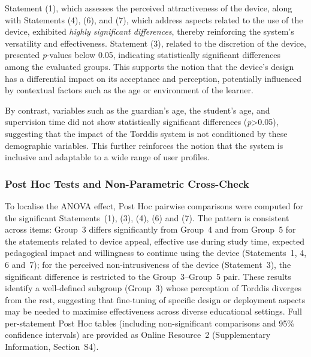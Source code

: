 Statement (1), which assesses the perceived attractiveness of the device, along with Statements (4), (6), and (7), which address aspects related to the use of the device, exhibited \textit{highly significant differences}, thereby reinforcing the system’s versatility and effectiveness. Statement (3), related to the discretion of the device, presented \textit{p}-values below 0.05, indicating statistically significant differences among the evaluated groups. This supports the notion that the device’s design has a differential impact on its acceptance and perception, potentially influenced by contextual factors such as the age or environment of the learner.

By contrast, variables such as the guardian’s age, the student’s age, and supervision time did not show statistically significant differences (\textit{p}>0.05), suggesting that the impact of the Torddis system is not conditioned by these demographic variables. This further reinforces the notion that the system is inclusive and adaptable to a wide range of user profiles.

\subsubsection{Post Hoc Tests and Non-Parametric Cross-Check}
\label{sec:posthoc-nonparam}
To localise the ANOVA effect, Post Hoc pairwise comparisons \citep{Ogrodniczek2025Comparative} were computed for the significant Statements~(1), (3), (4), (6) and (7). The pattern is consistent across items: Group~3 differs significantly from Group~4 and from Group~5 for the statements related to device appeal, effective use during study time, expected pedagogical impact and willingness to continue using the device (Statements~1, 4, 6 and~7); for the perceived non-intrusiveness of the device (Statement~3), the significant difference is restricted to the Group~3--Group~5 pair. These results identify a well-defined subgroup (Group~3) whose perception of Torddis diverges from the rest, suggesting that fine-tuning of specific design or deployment aspects may be needed to maximise effectiveness across diverse educational settings. Full per-statement Post Hoc tables (including non-significant comparisons and 95\% confidence intervals) are provided as Online Resource~2 (Supplementary Information, Section~S4).

